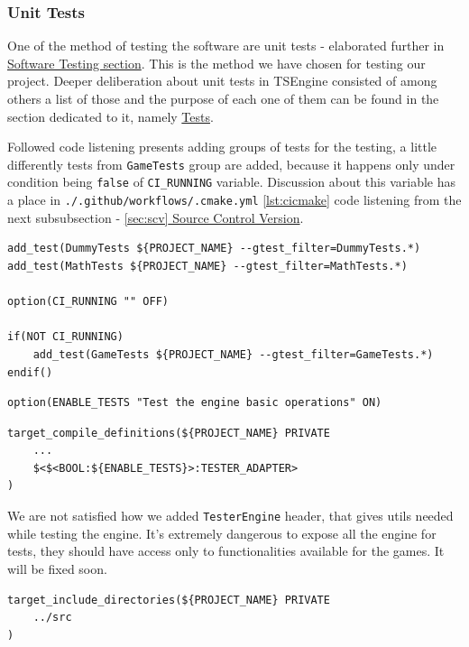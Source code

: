 \subsubsection{Unit Tests}
\label{sec:build_unit_tests}
\hspace{\parindent} One of the method of testing the software are unit tests - elaborated further in \hyperref[sec:testing]{Software Testing section}. This is the method we have chosen for testing our project.
Deeper deliberation about unit tests in TSEngine consisted of among others a list of those and the purpose of each one of them can be found in the section dedicated to it, namely \hyperref[sec:tests]{Tests}.

Followed code listening presents adding groups of tests for the testing, a little differently tests from \texttt{GameTests} group are added, because it happens only under condition being \texttt{false} of \texttt{CI\_RUNNING} variable.
Discussion about this variable has a place in \texttt{./.github/workflows/.cmake.yml} \ref{lst:cicmake} code listening from the next subsubsection - \hyperref[sec:scv]{\ref*{sec:scv} Source Control Version}.
\begin{lstlisting}[caption=Adding tests to CTest (./engine/CMakeLists.txt)]
add_test(DummyTests ${PROJECT_NAME} --gtest_filter=DummyTests.*)
add_test(MathTests ${PROJECT_NAME} --gtest_filter=MathTests.*)

option(CI_RUNNING "" OFF)

if(NOT CI_RUNNING)
    add_test(GameTests ${PROJECT_NAME} --gtest_filter=GameTests.*)
endif()
\end{lstlisting}

\begin{lstlisting}[caption=Enabling Tests(./CMakeLists.txt)]
option(ENABLE_TESTS "Test the engine basic operations" ON)
\end{lstlisting}

\begin{lstlisting}[caption=\texttt{TESTER\_ADAPTER} preprocessor declaration(./engine/CMakeLists.txt and ./engine/tests/CMakeLists.txt)]
target_compile_definitions(${PROJECT_NAME} PRIVATE
    ...
    $<$<BOOL:${ENABLE_TESTS}>:TESTER_ADAPTER>
)
\end{lstlisting}

We are not satisfied how we added \texttt{TesterEngine} header, that gives utils needed while testing the engine. It's extremely dangerous to expose all the engine for tests, they should have access only to functionalities available for the games. It will be fixed soon. 
\begin{lstlisting}[caption=Including common internal utils (./engine/tests/CMakeLists.txt)]
target_include_directories(${PROJECT_NAME} PRIVATE
    ../src
)
\end{lstlisting}

